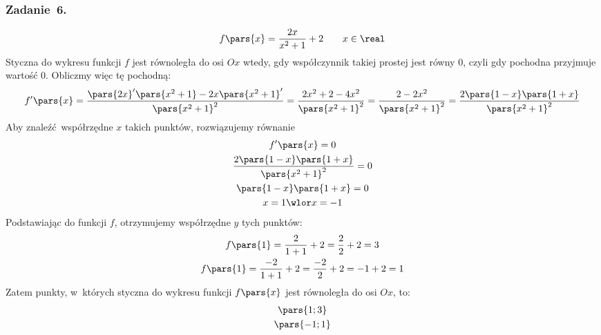 \subsubsection*{Zadanie~6.}
\begin{equation*}
    f\pars{x} = \frac{2x}{x^2 + 1} + 2 \qquad x \in \real
\end{equation*}
Styczna do wykresu funkcji \(f\) jest równoległa do osi \(Ox\) wtedy, gdy współczynnik takiej prostej jest równy \(0\), czyli gdy pochodna przyjmuje wartość \(0\). Obliczmy więc tę pochodną:
\begin{equation*}
    f'\pars{x}
        = \frac{\pars{2x}'\pars{x^2 + 1} - 2x\pars{x^2 + 1}'}{\pars{x^2 + 1}^2}
        = \frac{2x^2 + 2 - 4x^2}{\pars{x^2 + 1}^2}
        = \frac{2 - 2x^2}{\pars{x^2 + 1}^2}
        = \frac{2\pars{1 - x}\pars{1 + x}}{\pars{x^2 + 1}^2}
\end{equation*}
Aby znaleźć współrzędne \(x\) takich punktów, rozwiązujemy równanie
\begin{gather*}
    f'\pars{x} = 0\\
    \frac{2\pars{1 - x}\pars{1 + x}}{\pars{x^2 + 1}^2} = 0\\
    \pars{1 - x}\pars{1 + x} = 0\\
    x = 1 \wlor x = -1
\end{gather*}
Podstawiając do funkcji \(f\), otrzymujemy współrzędne \(y\) tych punktów:
\begin{gather*}
    f\pars{1} = \frac{2}{1 + 1} + 2
        = \frac{2}{2} + 2
        = 3\\
    f\pars{1} = \frac{-2}{1 + 1} + 2
        = \frac{-2}{2} + 2
        = -1 + 2
        = 1
\end{gather*}
Zatem punkty, w~których styczna do wykresu funkcji \(f\pars{x}\) jest równoległa do osi \(Ox\), to:
\begin{gather*}
    \pars{1; 3}\\
    \pars{-1; 1}
\end{gather*}
